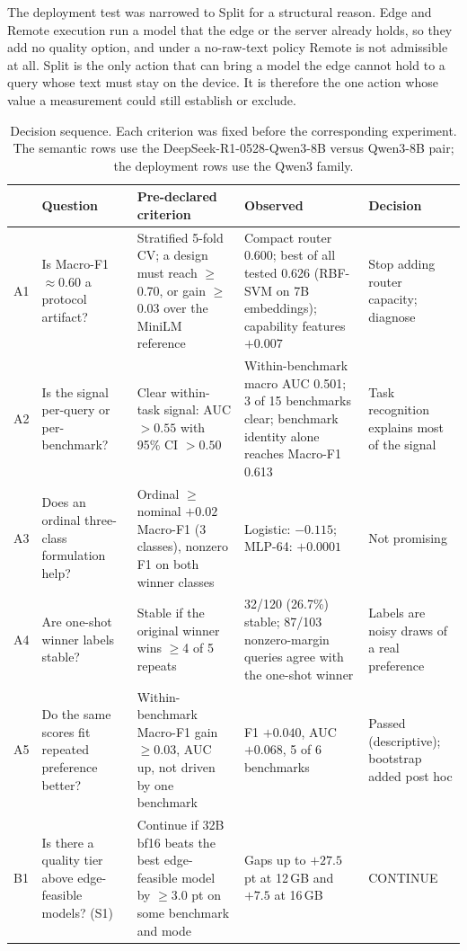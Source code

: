 \documentclass[lettersize,journal]{IEEEtran}
\begin{document}
The deployment test was narrowed to Split for a structural reason. Edge and Remote execution run a model that the edge or the server already holds, so they add no quality option, and under a no-raw-text policy Remote is not admissible at all. Split is the only action that can bring a model the edge cannot hold to a query whose text must stay on the device. It is therefore the one action whose value a measurement could still establish or exclude.

\begin{table}[!t]
\centering
\caption{Decision sequence. Each criterion was fixed before the corresponding experiment. The semantic rows use the DeepSeek-R1-0528-Qwen3-8B versus Qwen3-8B pair; the deployment rows use the Qwen3 family.}
\label{tab:ledger}
\footnotesize
\begin{tabular}{@{}p{0.5cm}p{3.5cm}p{4.2cm}p{4.4cm}p{3.1cm}@{}}
\toprule
& Question & Pre-declared criterion & Observed & Decision \\
\midrule
A1 & Is Macro-F1 $\approx$0.60 a protocol artifact? & Stratified 5-fold CV; a design must reach $\geq$0.70, or gain $\geq$0.03 over the MiniLM reference & Compact router 0.600; best of all tested 0.626 (RBF-SVM on 7B embeddings); capability features $+0.007$ & Stop adding router capacity; diagnose \\
A2 & Is the signal per-query or per-benchmark? & Clear within-task signal: AUC $>0.55$ with 95\% CI $>0.50$ & Within-benchmark macro AUC 0.501; 3 of 15 benchmarks clear; benchmark identity alone reaches Macro-F1 0.613 & Task recognition explains most of the signal \\
A3 & Does an ordinal three-class formulation help? & Ordinal $\geq$ nominal $+0.02$ Macro-F1 (3 classes), nonzero F1 on both winner classes & Logistic: $-0.115$; MLP-64: $+0.0001$ & Not promising \\
A4 & Are one-shot winner labels stable? & Stable if the original winner wins $\geq$4 of 5 repeats & 32/120 (26.7\%) stable; 87/103 nonzero-margin queries agree with the one-shot winner & Labels are noisy draws of a real preference \\
A5 & Do the same scores fit repeated preference better? & Within-benchmark Macro-F1 gain $\geq$0.03, AUC up, not driven by one benchmark & F1 $+0.040$, AUC $+0.068$, 5 of 6 benchmarks & Passed (descriptive); bootstrap added post hoc \\
B1 & Is there a quality tier above edge-feasible models? (S1) & Continue if 32B bf16 beats the best edge-feasible model by $\geq$3.0 pt on some benchmark and mode & Gaps up to $+27.5$ pt at 12\,GB and $+7.5$ at 16\,GB & CONTINUE \\

\end{tabular}
\end{table}
\end{document}
